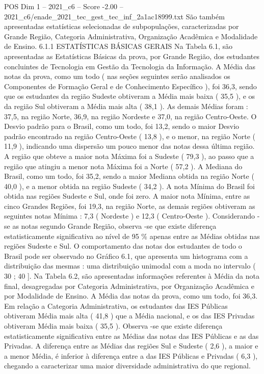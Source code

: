 \begin{textsample}{POS Dim 1 – 2021\_c6 – Score -2.00 – 2021\_c6/enade\_2021\_tec\_gest\_tec\_inf\_2a1ac18999.txt}
São também apresentadas estatísticas selecionadas de subpopulações, caracterizadas por Grande Região, Categoria Administrativa, Organização Acadêmica e Modalidade de Ensino. 6.1.1 ESTATÍSTICAS BÁSICAS GERAIS Na Tabela 6.1, são apresentadas as Estatísticas Básicas da prova, por Grande Região, dos estudantes concluintes de Tecnologia em Gestão da Tecnologia da Informação.
A Média das notas da prova, como um todo ( nas seções seguintes serão analisados os Componentes de Formação Geral e de Conhecimento Específico ), foi 36,3, sendo que os estudantes da região Sudeste obtiveram a Média mais baixa ( 35,5 ), e os da região Sul obtiveram a Média mais alta ( 38,1 ).
As demais Médias foram : 37,5, na região Norte, 36,9, na região Nordeste e 37,0, na região Centro-Oeste.
O Desvio padrão para o Brasil, como um todo, foi 13,2, sendo o maior Desvio padrão encontrado na região Centro-Oeste ( 13,8 ), e o menor, na região Norte ( 11,9 ), indicando uma dispersão um pouco menor das notas dessa última região.
A região que obteve a maior nota Máxima foi a Sudeste ( 79,3 ), ao passo que a região que atingiu a menor nota Máxima foi a Norte ( 57,2 ).
A Mediana do Brasil, como um todo, foi 35,2, sendo a maior Mediana obtida na região Norte ( 40,0 ), e a menor obtida na região Sudeste ( 34,2 ).
A nota Mínima do Brasil foi obtida nas regiões Sudeste e Sul, onde foi zero.
A maior nota Mínima, entre as cinco Grandes Regiões, foi 19,3, na região Norte, as demais regiões obtiveram as seguintes notas Mínima : 7,3 ( Nordeste ) e 12,3 ( Centro-Oeste ).
Considerando -se as notas segundo Grande Região, observa -se que existe diferença estatisticamente significativa ao nível de 95 \% apenas entre as Médias obtidas nas regiões Sudeste e Sul.
O comportamento das notas dos estudantes de todo o Brasil pode ser observado no Gráfico 6.1, que apresenta um histograma com a distribuição das mesmas : uma distribuição unimodal com a moda no intervalo ( 30 ; 40 ].
Na Tabela 6.2, são apresentadas informações referentes à Média da nota final, desagregadas por Categoria Administrativa, por Organização Acadêmica e por Modalidade de Ensino.
A Média das notas da prova, como um todo, foi 36,3.
Em relação a Categoria Administrativa, os estudantes das IES Públicas obtiveram Média mais alta ( 41,8 ) que a Média nacional, e os das IES Privadas obtiveram Média mais baixa ( 35,5 ).
Observa -se que existe diferença estatisticamente significativa entre as Médias das notas das IES Públicas e as das Privadas.
A diferença entre as Médias das regiões Sul e Sudeste ( 2,6 ), a maior e a menor Média, é inferior à diferença entre a das IES Públicas e Privadas ( 6,3 ), chegando a caracterizar uma maior diversidade administrativa do que regional.

\end{textsample}
